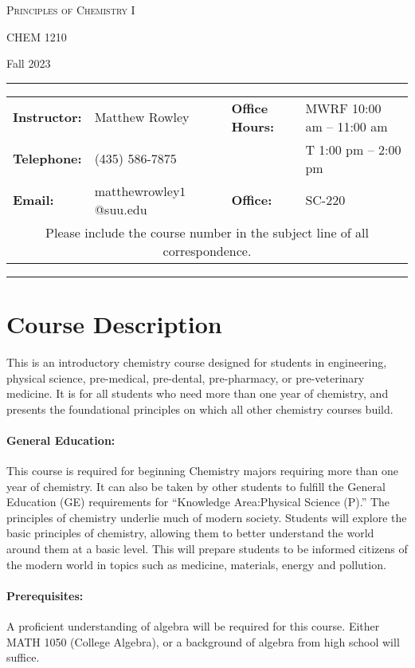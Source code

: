\documentclass[12pt, letterpaper]{article}
\begin{document}
\begin{center}
{\Large \textsc{Principles of Chemistry I}}

CHEM 1210
\end{center}
\begin{center}
	{\large Fall 2023}
\end{center}
\begin{center}
	\rule{0.99\textwidth}{0.4pt}
	\begin{tabular}{llcll}
		\textbf{Instructor:} & Matthew Rowley           &  & \textbf{Office Hours:} & MWRF 10:00 am -- 11:00 am \\
		\textbf{Telephone:}  & (435) 586-7875           &  &                        & T 1:00 pm -- 2:00 pm    \\
		\textbf{Email:}      & matthewrowley$1$@suu.edu &  & \textbf{Office:}       & SC-220                   \\
		\multicolumn{5}{c}{Please include the course number in the subject line of all correspondence.}
	\end{tabular}
	\rule{0.99\textwidth}{0.4pt}
\end{center}

\section*{Course Description} 
This is an introductory chemistry course designed for students in engineering, physical science, pre-medical, pre-dental, pre-pharmacy, or pre-veterinary medicine. It is for all students who need more than one year of chemistry, and presents the foundational principles on which all other chemistry courses build.

\paragraph{General Education:}
This course is required for beginning Chemistry majors requiring more than one year of chemistry. It can also be taken by other students to fulfill the General Education (GE) requirements for ``Knowledge Area:Physical Science (P).'' The principles of chemistry underlie much of modern society. Students will explore the basic principles of chemistry, allowing them to better understand the world around them at a basic level. This will prepare students to be informed citizens of the modern world in topics such as medicine, materials, energy and pollution.

\paragraph{Prerequisites:}
A proficient understanding of algebra will be required for this course. Either MATH 1050 (College Algebra), or a background of algebra from high school will suffice.
\end{document}
